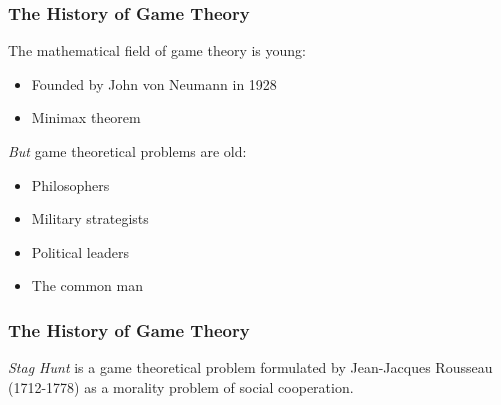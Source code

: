 \documentclass{beamer}
\begin{document}
\begin{frame}
 
\frametitle{The History of Game Theory}

The mathematical field of game theory is young:

\begin{itemize}
\item Founded by John von Neumann in 1928
  \item Minimax theorem
\end{itemize}

\emph{But} game theoretical problems are old:

\begin{itemize}
\item Philosophers
\item Military strategists
\item Political leaders
\item The common man
\end{itemize}

\end{frame}

\begin{frame}
  
\frametitle{The History of Game Theory}

\emph{Stag Hunt} is a game theoretical problem formulated by Jean-Jacques Rousseau (1712-1778) as a morality problem
of social cooperation.


\begin{table}
  \centering
  \setlength{\extrarowheight}{2pt}
\end{table}

\end{frame}
\end{document}
